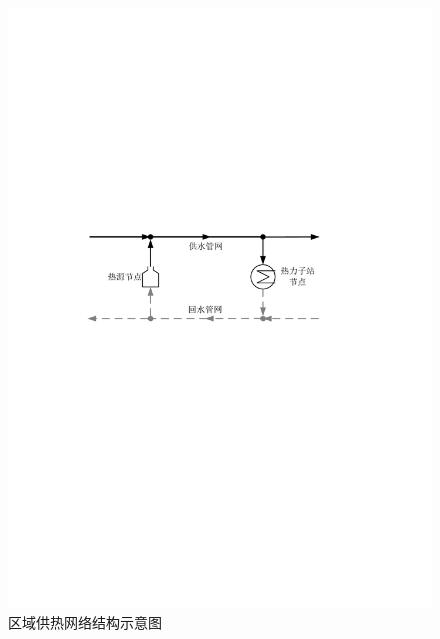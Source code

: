 \begin{figure}[H]
\centering
\includegraphics[scale=0.75]{figures/Chap4-3-DHN-Energy-Topo.pdf}
\caption{区域供热网络结构示意图}
\label{Fig:DHN-Topology}
\end{figure}


